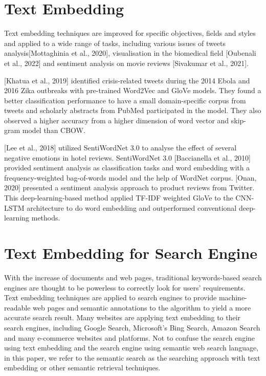 \section{Text Embedding}
Text embedding techniques are improved for specific objectives, fields and styles and applied to a wide range of tasks, including various issues of tweets analysis[Mottaghinia et al., 2020], visualisation in the biomedical field [Oubenali et al., 2022] and sentiment analysis on movie reviews [Sivakumar et al., 2021].

[Khatua et al., 2019] identified crisis-related tweets during the 2014 Ebola and 2016 Zika outbreaks with pre-trained Word2Vec and GloVe models.
They found a better classification performance to have a small domain-specific corpus from tweets and scholarly abstracts from PubMed participated in the model.
They also observed a higher accuracy from a higher dimension of word vector and skip-gram model than CBOW.

[Lee et al., 2018] utilized SentiWordNet 3.0 to analyse the effect of several negative emotions in hotel reviews.
SentiWordNet 3.0 [Baccianella et al., 2010] provided sentiment analysis as classification tasks and word embedding with a frequency-weighted bag-of-words model and the help of WordNet corpus.
[Onan, 2020] presented a sentiment analysis approach to product reviews from Twitter.
This deep-learning-based method applied TF-IDF weighted GloVe to the CNN-LSTM architecture to do word embedding and outperformed conventional deep-learning methods.

\section{Text Embedding for Search Engine}
With the increase of documents and web pages, traditional keywords-based search engines are thought to be powerless to correctly look for users' requirements.
Text embedding techniques are applied to search engines to provide machine-readable web pages and semantic annotations to the algorithm to yield a more accurate search result.
Many websites are applying text embedding to their search engines, including Google Search, Microsoft's Bing Search, Amazon Search and many e-commerce websites and platforms.
Not to confuse the search engine using text embedding and the search engine using semantic web search language, in this paper, we refer to the semantic search as the searching approach with text embedding or other semantic retrieval techniques. 

